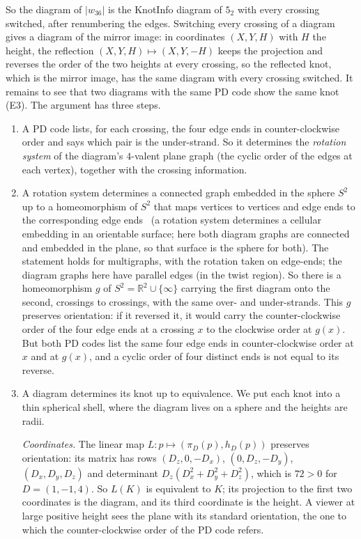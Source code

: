 \documentclass[11pt]{article}
\theoremstyle{plain}
\theoremstyle{definition}
\theoremstyle{remark}
\newcommand{\R}{\mathbb{R}}
\begin{document}
So the diagram of $|w_{36}|$ is the KnotInfo diagram of $5_2$ with every crossing switched, after
renumbering the edges. Switching every crossing of a diagram gives a diagram of the mirror image: in
coordinates $(X,Y,H)$ with $H$ the height, the reflection $(X,Y,H)\mapsto(X,Y,-H)$ keeps the
projection and reverses the order of the two heights at every crossing, so the reflected knot, which
is the mirror image, has the same diagram with every crossing switched. It remains to see that two diagrams with the same PD code show the same knot (E3). The argument has
three steps.
\begin{enumerate}
\item A PD code lists, for each crossing, the four edge ends in counter-clockwise order and says which
pair is the under-strand. So it determines the \emph{rotation system} of the diagram's $4$-valent plane
graph (the cyclic order of the edges at each vertex), together with the crossing information.
\item A rotation system determines a connected graph embedded in the sphere $S^2$ up to a
homeomorphism of $S^2$ that maps vertices to vertices and edge ends to the corresponding edge
ends~\cite[\S3.2, Rotation systems]{MT01} (a rotation system
determines a cellular embedding in an orientable surface; here both diagram graphs are connected and
embedded in the plane, so that surface is the sphere for both). The statement holds for
multigraphs, with the rotation taken on edge-ends; the diagram graphs here have parallel edges (in the
twist region). So there is a homeomorphism $g$ of $S^2=\R^2\cup\{\infty\}$
carrying the first diagram onto the second, crossings to crossings, with the same over- and
under-strands. This $g$ preserves orientation: if it reversed it, it would carry the
counter-clockwise order of the four edge ends at a crossing $x$ to the clockwise order at $g(x)$.
But both PD codes list the same four edge ends in counter-clockwise order at $x$ and at $g(x)$, and a
cyclic order of four distinct ends is not equal to its reverse.
\item A diagram determines its knot up to equivalence. We put each knot into a thin spherical shell,
where the diagram lives on a sphere and the heights are radii.

\emph{Coordinates.} The linear map $L:p\mapsto(\pi_D(p),h_D(p))$ preserves orientation: its matrix has
rows $(D_z,0,-D_x)$, $(0,D_z,-D_y)$, $(D_x,D_y,D_z)$ and determinant $D_z(D_x^2+D_y^2+D_z^2)$, which is
$72>0$ for $D=(1,-1,4)$. So $L(K)$ is equivalent to $K$; its projection to the first two coordinates is
the diagram, and its third coordinate is the height. A viewer at large positive height sees the plane
with its standard orientation, the one to which the counter-clockwise order of the PD code refers.


\end{enumerate}
\end{document}

